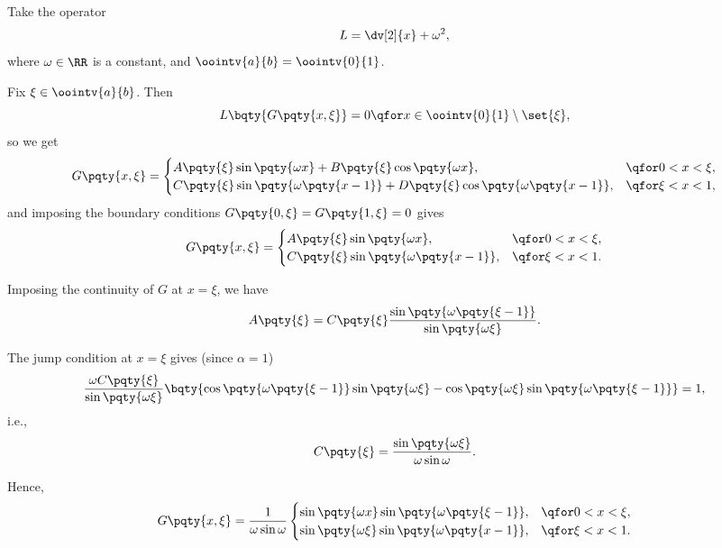 \begin{example}
    \label{ex:greens-function-for-simple-operator}%
    Take the operator
    \begin{equation}
        L = \dv[2]{x} + \omega^2,
    \end{equation}
    where \(\omega \in \RR\) is a constant, and \(\oointv{a}{b} = \oointv{0}{1}\).

    Fix \(\xi \in \oointv{a}{b}\). Then
    \[
        L\bqty{G\pqty{x, \xi}} = 0 \qfor x \in \oointv{0}{1} \setminus \set{\xi},
    \]
    so we get
    \begin{equation}
        G\pqty{x, \xi} = \begin{cases}
            A\pqty{\xi} \sin\pqty{\omega x} + B\pqty{\xi} \cos\pqty{\omega x}, & \qfor 0 < x < \xi, \\
            C\pqty{\xi} \sin\pqty{\omega \pqty{x - 1}} + D\pqty{\xi} \cos\pqty{\omega \pqty{x - 1}}, & \qfor \xi < x < 1,
        \end{cases}
    \end{equation}
    and imposing the boundary conditions \(G\pqty{0, \xi} = G\pqty{1, \xi} = 0\) gives
    \begin{equation}
        G\pqty{x, \xi} = \begin{cases}
            A\pqty{\xi} \sin\pqty{\omega x}, & \qfor 0 < x < \xi, \\
            C\pqty{\xi} \sin\pqty{\omega \pqty{x - 1}}, & \qfor \xi < x < 1.
        \end{cases}
    \end{equation}

    Imposing the continuity of \(G\) at \(x = \xi\), we have
    \begin{equation}
        A\pqty{\xi} = C\pqty{\xi} \frac{\sin\pqty{\omega \pqty{\xi - 1}}}{\sin\pqty{\omega \xi}}.
    \end{equation}

    The jump condition at \(x = \xi\) gives (since \(\alpha = 1\))
    \begin{equation}
        \frac{\omega C\pqty{\xi}}{\sin \pqty{\omega \xi}} \bqty{\cos\pqty{\omega \pqty{\xi - 1}} \sin \pqty{\omega \xi} - \cos\pqty{\omega \xi} \sin\pqty{\omega \pqty{\xi - 1}}} = 1,
    \end{equation}
    i.e.,
    \begin{equation}
        C\pqty{\xi} = \frac{\sin \pqty{\omega \xi}}{\omega \sin \omega}.
    \end{equation}

    Hence,
    \begin{equation}
        G\pqty{x, \xi} = \frac{1}{\omega \sin \omega} \begin{cases}
            \sin\pqty{\omega x} \sin\pqty{\omega \pqty{\xi - 1}}, & \qfor 0 < x < \xi, \\
            \sin\pqty{\omega \xi} \sin\pqty{\omega \pqty{x - 1}}, & \qfor \xi < x < 1.
        \end{cases}
    \end{equation}
\end{example}

